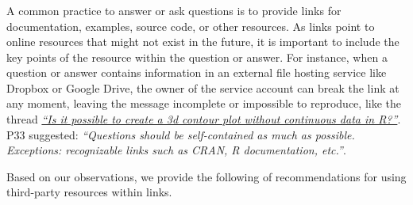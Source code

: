 \subsubsection{\recd}

    A common practice to answer or ask questions is to provide links for documentation, examples, source code, or other resources.
    As links point to online resources that might not exist in the future, it is important to include the key points of the resource within the question or answer.
    For instance, when a question or answer contains information in an external file hosting service like Dropbox or Google Drive, the owner of the service account can break the link at any moment, leaving the message incomplete or impossible to reproduce, like the thread \textit{\href{http://goo.gl/5nanFU}{``Is it possible to create a 3d contour plot without continuous data in R?''}}.
    P33 suggested: \textit{``Questions should be self-contained as much as possible. Exceptions: recognizable links such as CRAN, R documentation, etc.''}.

    Based on our observations, we provide the following of recommendations for using third-party resources within links.

